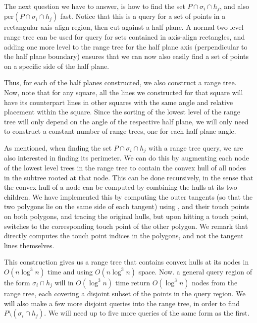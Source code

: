 \documentclass{article}
\begin{document}
The next question we have to answer, is how to find the set $P \cap \sigma_i \cap h_j$, and also $\text{per}(P \cap \sigma_i \cap h_j)$ fast. Notice that this is a query for a set of points in a rectangular axis-align region, then cut against a half plane. A normal two-level range tree \cite{range_trees} can be used for query for sets contained in axis-align rectangles, and adding one more level to the range tree for the half plane axis (perpendicular to the half plane boundary) ensures that we can now also easily find a set of points on a specific side of the half plane. 

Thus, for each of the half planes constructed, we also construct a range tree. Now, note that for any square, all the lines we constructed for that square will have its counterpart lines in other squares with the same angle and relative placement within the square. Since the sorting of the lowest level of the range tree will only depend on the angle of the respective half plane, we will only need to construct a constant number of range trees, one for each half plane angle. 

As mentioned, when finding the set $P \cap \sigma_i \cap h_j$ with a range tree query, we are also interested in finding its perimeter. We can do this by augmenting each node of the lowest level trees in the range tree to contain the convex hull of all nodes in the subtree rooted at that node. This can be done recursively, in the sense that the convex hull of a node can be computed by combining the hulls at its two children. We have implemented this by computing the outer tangents (so that the two polygons lie on the same side of each tangent) using \cite{ks95}, and their touch points on both polygons, and tracing the original hulls, but upon hitting a touch point, switches to the corresponding touch point of the other polygon. We remark that \cite{ks95} directly computes the touch point indices in the polygons, and not the tangent lines themselves.

This construction gives us a range tree that contains convex hulls at its nodes in $O(n \log^3 n)$ time and using $O(n \log^3 n)$ space. Now. a general query region of the form $\sigma_i \cap h_j$ will in $O(\log^3n)$ time return $O(\log^3 n)$ nodes from the range tree, each covering a disjoint subset of the points in the query region. We will also make a few more disjoint queries into the range tree, in order to find $P \setminus (\sigma_i \cap h_j)$. We will need up to five more queries of the same form as the first. 
\end{document}
